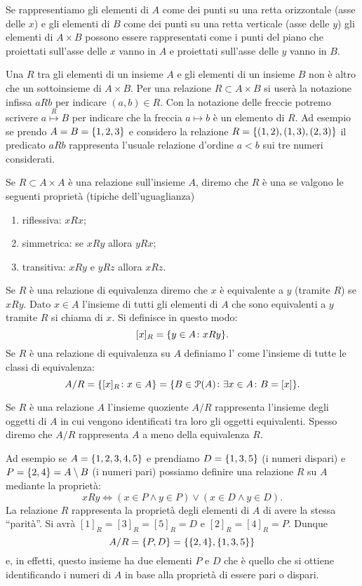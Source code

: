 Se rappresentiamo gli elementi di $A$ come dei punti su una retta
orizzontale (asse delle $x$) e gli elementi di $B$ come dei punti
su una retta verticale (asse delle $y$) gli elementi di $A\times B$
possono essere rappresentati come i punti del piano che proiettati sull'asse
delle $x$ vanno in $A$ e proiettati sull'asse delle $y$ vanno in $B$.
  
Una  $R$ tra gli elementi di un insieme $A$ e gli elementi
di un insieme $B$ non è altro che un sottoinsieme di $A\times B$.
Per una relazione $R\subset A\times B$ si userà la notazione infissa
$aRb$ per indicare $(a,b)\in R$.
Con la notazione delle freccie potremo scrivere $a \stackrel R \mapsto B$
per indicare che la freccia $a\mapsto b$ è un elemento di $R$. 
Ad esempio se prendo $A=B={\left\{ 1,2,3 \right\}}$ e considero la relazione 
$R={\left\{ (1,2),(1,3),(2,3) \right\}}$
il predicato $aRb$ rappresenta l'usuale relazione d'ordine $a<b$ sui
tre numeri considerati.

\begin{definition}
Se $R\subset A\times A$ è una relazione sull'insieme $A$, diremo che 
$R$ è una  se valgono le seguenti proprietà
(tipiche dell'uguaglianza)
\begin{enumerate}
  \item riflessiva: $x R x$;
  \item simmetrica: se $x R y$ allora $y R x$;
  \item transitiva: $x R y$ e $yRz$ allora $x R z$.
\end{enumerate}
Se $R$ è una relazione di equivalenza diremo che $x$ è equivalente a $y$ 
(tramite $R$) se $xRy$.
Dato $x \in A$ l'insieme di tutti gli elementi di $A$ che sono equivalenti 
a $y$ tramite $R$ si chiama  di $x$. 
Si definisce in questo modo:
\[
  [x]_R = {\left\{ y\in A \colon xRy \right\}}.  
\]
Se $R$ è una relazione di equivalenza su $A$ definiamo 
l'
come l'insieme di tutte le classi di equivalenza:
\[
 A/R 
 = {\left\{ [x]_R\colon x\in A \right\}} 
 = {\left\{ B\in \mathcal P(A)\colon \exists x\in A\colon B=[x] \right\}}.  
\]
\end{definition}

Se $R$ è una relazione $A$ l'insieme quoziente $A/R$ rappresenta l'insieme 
degli oggetti di $A$ in cui vengono identificati tra loro gli oggetti equivalenti.
Spesso diremo che $A/R$ rappresenta $A$ a meno della equivalenza $R$.

Ad esempio se $A={\left\{ 1,2,3,4,5 \right\}}$ e prendiamo $D={\left\{ 1,3,5 \right\}}$ (i numeri dispari)
e $P={\left\{ 2,4 \right\}}=A\setminus B$ 
(i numeri pari) possiamo definire una relazione $R$ su $A$ mediante la proprietà:
\[
 x R  y \iff (x\in P \land y\in P) \lor (x\in D \land y\in D).
\]
La relazione $R$ rappresenta la proprietà degli elementi di $A$ 
di avere la stessa ``parità''. 
Si avrà $[1]_R = [3]_R=[5]_R= D$ e $[2]_R=[4]_R=P$.
Dunque 
\[
   A/R = {\left\{ P,D \right\}} = {\left\{ {\left\{ 2,4 \right\}},{\left\{ 1,3,5 \right\}} \right\}}
\]
e, in effetti, questo insieme ha due elementi $P$ e $D$ che è quello 
che si ottiene identificando i numeri di $A$ in base alla proprietà 
di essere pari o dispari. 

